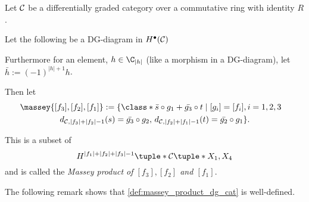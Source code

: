 \begin{definition}
    \label{def:massey_product_dg_cat}
    Let \( {\mathcal{C}} \) be a differentially graded category over a commutative ring with identity \( R \).

    Let the following be a DG-diagram in \( H^\bullet({\mathcal{C}}) \)
    \begin{center}
    \end{center}

    Furthermore for an element, \( h \in \C_{|h|} \) (like a morphism in a DG-diagram), let \( \bar{h} := (-1)^{|h| + 1}h \).

    Then let
    \begin{multline*}
        \massey{[f_3], [f_2], [f_1]} :=
        \{
            \class*{
                \bar{s} \circ g_1 + \bar{g_3} \circ t
            }
            \mid [g_i] = [f_i], i = 1, 2, 3 \quad \\
            d_{\Cc, |f_3| + |f_2| - 1}(s) = \bar{g_3} \circ g_2, \,
            d_{\Cc, |f_2| + |f_1| - 1}(t) = \bar{g_2} \circ g_1
        \}.
    \end{multline*}

    This is a subset of
    \[
        H^{|f_1| + |f_2| + |f_3| - 1}\tuple*{\Cc\tuple*{X_1, X_4}}
    \]
    and is called the \emph{Massey product of \( [f_3], [f_2] \) and \( [f_1] \)}.
\end{definition}

The following remark shows that \autoref{def:massey_product_dg_cat} is well-defined.

